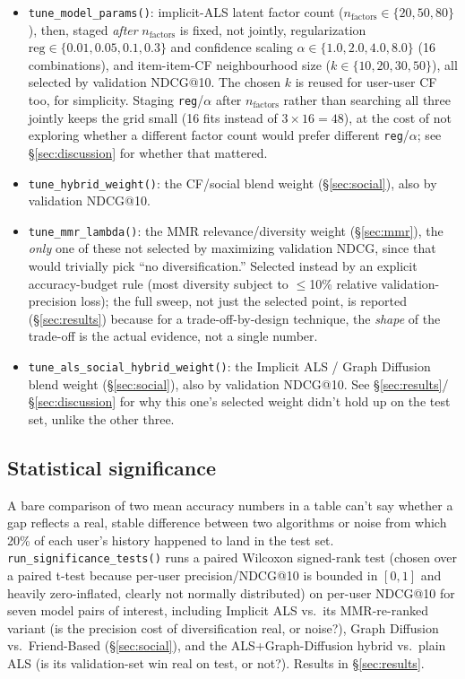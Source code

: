 \documentclass[11pt,a4paper]{article}
\newcommand{\code}[1]{\texttt{#1}}
\newcommand{\secref}[1]{\S\ref{#1}}
\begin{document}
\begin{itemize}[leftmargin=*]
  \item \code{tune\_model\_params()}: implicit-ALS latent factor count ($n_{\text{factors}} \in \{20, 50, 80\}$), then, staged \emph{after} $n_{\text{factors}}$ is fixed, not jointly, regularization $\text{reg} \in \{0.01, 0.05, 0.1, 0.3\}$ and confidence scaling $\alpha \in \{1.0, 2.0, 4.0, 8.0\}$ (16 combinations), and item-item-CF neighbourhood size ($k \in \{10, 20, 30, 50\}$), all selected by validation NDCG@10. The chosen $k$ is reused for user-user CF too, for simplicity. Staging \code{reg}/$\alpha$ after $n_{\text{factors}}$ rather than searching all three jointly keeps the grid small (16 fits instead of $3\times16=48$), at the cost of not exploring whether a different factor count would prefer different \code{reg}/$\alpha$; see \secref{sec:discussion} for whether that mattered.
  \item \code{tune\_hybrid\_weight()}: the CF/social blend weight (\secref{sec:social}), also by validation NDCG@10.
  \item \code{tune\_mmr\_lambda()}: the MMR relevance/diversity weight (\secref{sec:mmr}), the \emph{only} one of these not selected by maximizing validation NDCG, since that would trivially pick ``no diversification.'' Selected instead by an explicit accuracy-budget rule (most diversity subject to $\leq$10\% relative validation-precision loss); the full sweep, not just the selected point, is reported (\secref{sec:results}) because for a trade-off-by-design technique, the \emph{shape} of the trade-off is the actual evidence, not a single number.
  \item \code{tune\_als\_social\_hybrid\_weight()}: the Implicit ALS / Graph Diffusion blend weight (\secref{sec:social}), also by validation NDCG@10. See \secref{sec:results}/\secref{sec:discussion} for why this one's selected weight didn't hold up on the test set, unlike the other three.
\end{itemize}

\subsection{Statistical significance}

A bare comparison of two mean accuracy numbers in a table can't say whether a gap reflects a real, stable difference between two algorithms or noise from which 20\% of each user's history happened to land in the test set. \code{run\_significance\_tests()} runs a paired Wilcoxon signed-rank test (chosen over a paired t-test because per-user precision/NDCG@10 is bounded in $[0,1]$ and heavily zero-inflated, clearly not normally distributed) on per-user NDCG@10 for seven model pairs of interest, including Implicit ALS vs.\ its MMR-re-ranked variant (is the precision cost of diversification real, or noise?), Graph Diffusion vs.\ Friend-Based (\secref{sec:social}), and the ALS+Graph-Diffusion hybrid vs.\ plain ALS (is its validation-set win real on test, or not?). Results in \secref{sec:results}.
\end{document}
